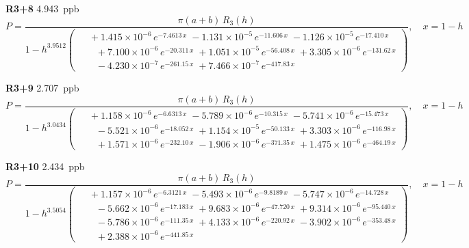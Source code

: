 \documentclass[12pt]{article}
\begin{document}
\noindent\textbf{R3+8} 4.943~ppb\nopagebreak
\begin{equation*}
P = \frac{\pi(a{+}b)\,R_3(h)}{1 - h^{3.9512}\!\left(\!\begin{aligned}
  &\; +1.415{\times}10^{-6}\,e^{-7.4613\,x} \; -1.131{\times}10^{-5}\,e^{-11.606\,x} \; -1.126{\times}10^{-5}\,e^{-17.410\,x} \\[-3pt]
  &\quad +7.100{\times}10^{-6}\,e^{-20.311\,x} \; +1.051{\times}10^{-5}\,e^{-56.408\,x} \; +3.305{\times}10^{-6}\,e^{-131.62\,x} \\[-3pt]
  &\quad -4.230{\times}10^{-7}\,e^{-261.15\,x} \; +7.466{\times}10^{-7}\,e^{-417.83\,x}
\end{aligned}\!\right)}, \quad x = 1{-}h
\end{equation*}

\noindent\textbf{R3+9} 2.707~ppb\nopagebreak
\begin{equation*}
P = \frac{\pi(a{+}b)\,R_3(h)}{1 - h^{3.0434}\!\left(\!\begin{aligned}
  &\; +1.158{\times}10^{-6}\,e^{-6.6313\,x} \; -5.789{\times}10^{-6}\,e^{-10.315\,x} \; -5.741{\times}10^{-6}\,e^{-15.473\,x} \\[-3pt]
  &\quad -5.521{\times}10^{-6}\,e^{-18.052\,x} \; +1.154{\times}10^{-5}\,e^{-50.133\,x} \; +3.303{\times}10^{-6}\,e^{-116.98\,x} \\[-3pt]
  &\quad +1.571{\times}10^{-6}\,e^{-232.10\,x} \; -1.906{\times}10^{-6}\,e^{-371.35\,x} \; +1.475{\times}10^{-6}\,e^{-464.19\,x}
\end{aligned}\!\right)}, \quad x = 1{-}h
\end{equation*}

\noindent\textbf{R3+10} 2.434~ppb\nopagebreak
\begin{equation*}
P = \frac{\pi(a{+}b)\,R_3(h)}{1 - h^{3.5054}\!\left(\!\begin{aligned}
  &\; +1.157{\times}10^{-6}\,e^{-6.3121\,x} \; -5.493{\times}10^{-6}\,e^{-9.8189\,x} \; -5.747{\times}10^{-6}\,e^{-14.728\,x} \\[-3pt]
  &\quad -5.662{\times}10^{-6}\,e^{-17.183\,x} \; +9.683{\times}10^{-6}\,e^{-47.720\,x} \; +9.314{\times}10^{-6}\,e^{-95.440\,x} \\[-3pt]
  &\quad -5.786{\times}10^{-6}\,e^{-111.35\,x} \; +4.133{\times}10^{-6}\,e^{-220.92\,x} \; -3.902{\times}10^{-6}\,e^{-353.48\,x} \\[-3pt]
  &\quad +2.388{\times}10^{-6}\,e^{-441.85\,x}
\end{aligned}\!\right)}, \quad x = 1{-}h
\end{equation*}
\end{document}
